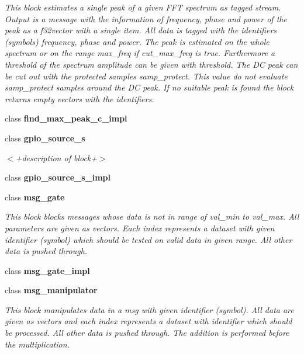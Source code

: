 \begin{DoxyCompactItemize}
\begin{DoxyCompactList}\small\item\em This block estimates a single peak of a given F\+FT spectrum as tagged stream. Output is a message with the information of frequency, phase and power of the peak as a f32vector with a single item. All data is tagged with the identifiers (symbols) \textquotesingle{}frequency\textquotesingle{}, \textquotesingle{}phase\textquotesingle{} and \textquotesingle{}power\textquotesingle{}. The peak is estimated on the whole spectrum or on the range max\+\_\+freq if cut\+\_\+max\+\_\+freq is true. Furthermore a threshold of the spectrum amplitude can be given with threshold. The DC peak can be cut out with the protected samples samp\+\_\+protect. This value do not evaluate samp\+\_\+protect samples around the DC peak. If no suitable peak is found the block returns empty vectors with the identifiers. \end{DoxyCompactList}\item 
class {\bf find\+\_\+max\+\_\+peak\+\_\+c\+\_\+impl}
\item 
class {\bf gpio\+\_\+source\+\_\+s}
\begin{DoxyCompactList}\small\item\em $<$+description of block+$>$ \end{DoxyCompactList}\item 
class {\bf gpio\+\_\+source\+\_\+s\+\_\+impl}
\item 
class {\bf msg\+\_\+gate}
\begin{DoxyCompactList}\small\item\em This block blocks messages whose data is not in range of val\+\_\+min to val\+\_\+max. All parameters are given as vectors. Each index represents a dataset with given identifier (symbol) which should be tested on valid data in given range. All other data is pushed through. \end{DoxyCompactList}\item 
class {\bf msg\+\_\+gate\+\_\+impl}
\item 
class {\bf msg\+\_\+manipulator}
\begin{DoxyCompactList}\small\item\em This block manipulates data in a msg with given identifier (symbol). All data are given as vectors and each index represents a dataset with identifier which should be processed. All other data is pushed through. The addition is performed before the multiplication. \end{DoxyCompactList}\item 

\end{DoxyCompactItemize}

